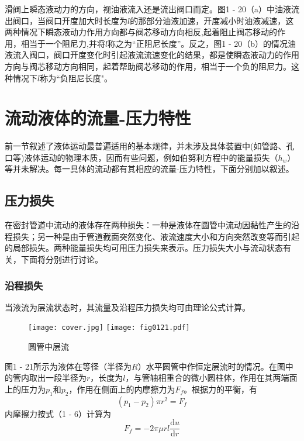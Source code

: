     滑阀上瞬态液动力的方向，视油液流入还是流出阀口而定。图1 - 20（a）中油液流出阀口，当阀口开度加大时长度为$l$的那部分油液加速，开度减小时油液减速，这两种情况下瞬态液动力作用方向都与阀芯移动方向相反,起着阻止阀芯移动的作用，相当于一个阻尼力,并将$l$称之为“正阻尼长度”。反之，图1 - 20（b）的情况油液流入阀口，阀口开度变化时引起液流流速变化的结果，都是使瞬态液动力的作用方向与阀芯移动方向相同，起着帮助阀芯移动的作用，相当于一个负的阻尼力。这种情况下$l$称为“负阻尼长度"。


\section{流动液体的流量-压力特性}

前一节叙述了液体运动最普遍适用的基本规律，并未涉及具体装置中(如管路、孔口等)液体运动的物理本质，因而有些问题，例如伯努利方程中的能量损失（$h_{w}$）等并未解决。每一具体的流动都有其相应的流量-压力特性，下面分别加以叙述。

\subsection*{压力损失}

在密封管道中流动的液体存在两种损失：一种是液体在圆管中流动因黏性产生的沿程损失；另一种是由于管道截面突然变化、液流速度大小和方向突然改变等而引起的局部损失。两种能量损失均可用压力损失来表示。压力损失大小与流动状态有关，下面将分别进行讨论。


\subsubsection*{沿程损失}

当液流为层流状态时，其流量及沿程压力损失均可由理论公式计算。

\begin{figure}
    \centering
    \ifOpenSource
    \texttt{[image: cover.jpg]}
    \else
    \texttt{[image: fig0121.pdf]}
    \fi
    \caption{圆管中层流}%
    \label{fig0121}
\end{figure}

图1 - 21所示为液体在等径（半径为$R$）水平圆管中作恒定层流时的情况。在图中的管内取出一段半径为$r$，长度为$l$，与管轴相重合的微小圆柱体，作用在其两端面上的压力为$p_{1}$和$p_{2}$，作用在侧面上的内摩擦力为$F_{f}$。根据力的平衡，有
\begin{equation*}
(p_{1}-p_{2})\pi r^{2}=F_{f}
\end{equation*}
内摩擦力按式（1 - 6）计算为
\begin{equation*}
F_{f}=-2\pi \mu rl \frac{\mathrm{d}u}{\mathrm{d}r}
\end{equation*}


